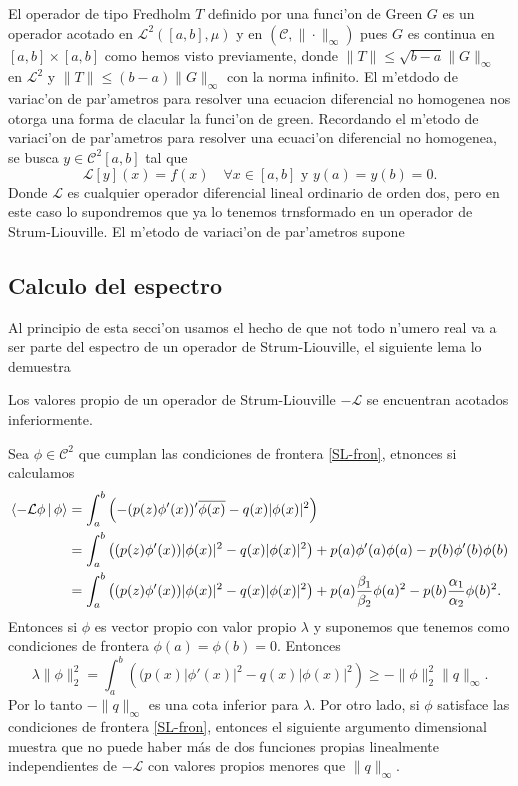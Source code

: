 \documentclass[main.tex]{subfiles}
\begin{document}
\obs El operador de tipo Fredholm $T$ definido por una funci'on de Green $G$ es un operador acotado en $\mathcal{L}^{2}([a,b],\mu)$ y en $(\mathcal{C},\|\cdot\|_{\infty})$ pues $G$ es continua en $[a,b]\times[a,b]$ como hemos visto previamente, donde $\|T\|\leq\sqrt{b-a}\|G\|_{\infty}$ en $\mathcal{L}^{2}$ y $\|T\|\leq(b-a)\|G\|_{\infty}$ con la norma infinito.
\obs El m'etdodo de variac'on de par'ametros para resolver una ecuacion diferencial no homogenea nos otorga una forma de clacular la funci'on de green. Recordando el m'etodo de variaci'on de par'ametros para resolver una ecuaci'on diferencial no homogenea, se busca $y\in\mathcal{C}^{2}[a,b]$ tal que
\[
  \mathcal{L}[y](x)=f(x)\quad\forall x\in[a,b] \text{ y }y(a)=y(b)=0.
\]
Donde $\mathcal{L}$ es cualquier operador diferencial lineal ordinario de orden dos, pero en este caso lo supondremos que ya lo tenemos trnsformado en un operador de Strum-Liouville. El m'etodo de variaci'on de par'ametros supone
\subsection{Calculo del espectro}
\noindent Al principio de esta secci'on usamos el hecho de que not todo n'umero real va a ser parte del espectro de un operador de Strum-Liouville, el siguiente lema lo demuestra
\begin{lema}
  Los valores propio de un operador de Strum-Liouville $-\mathcal{L}$ se encuentran acotados inferiormente.
  \end{lema}
  \dem Sea $\phi\in\mathcal{C}^{2}$ que cumplan las condiciones de frontera \ref{SL-fron}, etnonces si calculamos
  \begin{align*}  \braket{-\mathcal{L}\phi\,|\,\phi}&=\int_{a}^{b}\left(-(p(z)\phi'(x))'\overline{\phi(x)}-q(x)|\phi(x)|^{2}\right)\\
                              &=\int_{a}^{b}\left((p(z)\phi'(x))|\phi(x)|^{2}-q(x)|\phi(x)|^{2}\right)
                                                +p(a)\phi'(a)\phi(a)-p(b)\phi'(b)\phi(b)\\
                              &=\int_{a}^{b}\left((p(z)\phi'(x))|\phi(x)|^{2}-q(x)|\phi(x)|^{2}\right)
                              +p(a)\frac{\beta_{1}}{\beta_{2}}\phi(a)^{2}-p(b)\frac{\alpha_{1}}{\alpha_{2}}\phi(b)^{2}.
  \end{align*}
  Entonces si $\phi$ es vector propio con valor propio $\lambda$ y suponemos que tenemos como condiciones de frontera $\phi(a)=\phi(b)=0.$ Entonces
  \[
    \lambda\|\phi\|_{2}^{2}=\int_{a}^{b}\left((p(x)|\phi'(x)|^{2}-q(x)|\phi(x)|^{2}\right)\geq-\|\phi\|^{2}_{2}\|q\|_{\infty}.
  \]
  Por lo tanto $-\|q\|_{\infty}$ es una cota inferior para $\lambda$. Por otro lado, si $\phi$ satisface las condiciones de frontera \ref{SL-fron},
entonces el siguiente argumento dimensional muestra que no puede haber más de dos funciones propias linealmente independientes de $-\mathcal{L}$ con valores propios menores que $\|q\|_{\infty}$.
\end{document}
